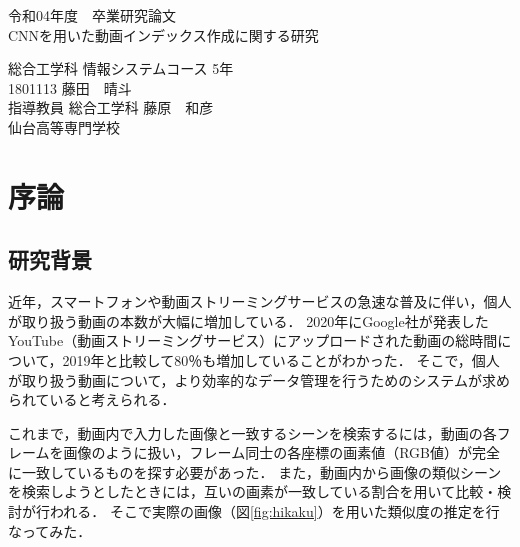 \documentclass[a4j,12pt,dvipdfmx]{jreport}
\begin{document}
\begin{titlepage} \centering
  \null \null
  \vspace{10mm}
  令和04年度　卒業研究論文\\
  \vspace{55.15mm}
  \null
  {\Large CNNを用いた動画インデックス作成に関する研究}\\
  
  \vspace{87.5mm}
  
  \large
  総合工学科 情報システムコース 5年\\[1mm]
  1801113 藤田　晴斗\\[1mm]
  指導教員 総合工学科 藤原　和彦\\
  
  \vspace{16mm}
  {仙台高等専門学校}
  \null

\end{titlepage}

\clearpage {\clearpage}
\large
\renewcommand{\baselinestretch}{1.1}

\chapter{序論}
\label{sec:introducion}

\section{研究背景}
近年，スマートフォンや動画ストリーミングサービスの急速な普及に伴い，個人が取り扱う動画の本数が大幅に増加している．
2020年にGoogle社が発表したYouTube（動画ストリーミングサービス）にアップロードされた動画の総時間について，2019年と比較して80％も増加していることがわかった\cite{google_data}．
そこで，個人が取り扱う動画について，より効率的なデータ管理を行うためのシステムが求められていると考えられる．

これまで，動画内で入力した画像と一致するシーンを検索するには，動画の各フレームを画像のように扱い，フレーム同士の各座標の画素値（RGB値）が完全に一致しているものを探す必要があった．
また，動画内から画像の類似シーンを検索しようとしたときには，互いの画素が一致している割合を用いて比較・検討が行われる．
そこで実際の画像（図\ref{fig:hikaku}）を用いた類似度の推定を行なってみた．
\end{document}
